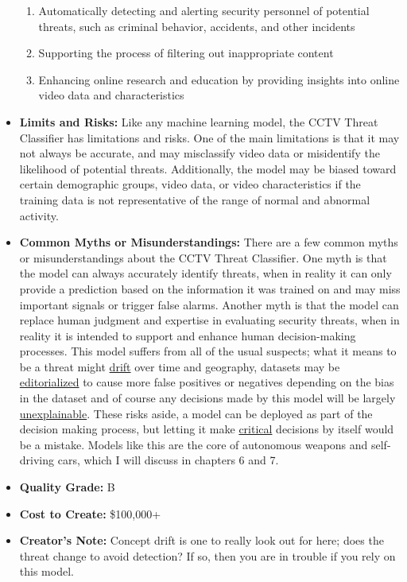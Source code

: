 \begin{itemize}
        \begin{enumerate}  
            \item Automatically detecting and alerting security personnel of potential threats, such as criminal behavior, accidents, and other incidents
            \item Supporting the process of filtering out inappropriate content
            \item Enhancing online research and education by providing insights into online video data and characteristics
        \end{enumerate}
    \item \textbf{Limits and Risks:} Like any machine learning model, the CCTV Threat Classifier has limitations and risks. One of the main limitations is that it may not always be accurate, and may misclassify video data or misidentify the likelihood of potential threats. Additionally, the model may be biased toward certain demographic groups, video data, or video characteristics if the training data is not representative of the range of normal and abnormal activity.
    \item \textbf{Common Myths or Misunderstandings:} There are a few common myths or misunderstandings about the CCTV Threat Classifier. One myth is that the model can always accurately identify threats, when in reality it can only provide a prediction based on the information it was trained on and may miss important signals or trigger false alarms. Another myth is that the model can replace human judgment and expertise in evaluating security threats, when in reality it is intended to support and enhance human decision-making processes. This model suffers from all of the usual suspects; what it means to be a threat might \hyperref[sec:drift]{drift} over time and geography, datasets may be \hyperref[sec:janitor]{editorialized} to cause more false positives or negatives depending on the bias in the dataset and of course any decisions made by this model will be largely \hyperref[sec:explain]{unexplainable}. These risks aside, a model can be deployed as part of the decision making process, but letting it make \hyperref[sec:creative]{critical} decisions by itself would be a mistake. Models like this are the core of autonomous weapons and self-driving cars, which I will discuss in chapters 6 and 7.
    \item \textbf{Quality Grade:} B
    \item \textbf{Cost to Create:} \$100,000+
    \item \textbf{Creator's Note:} Concept drift is one to really look out for here; does the threat change to avoid detection? If so, then you are in trouble if you rely on this model.
\end{itemize}



